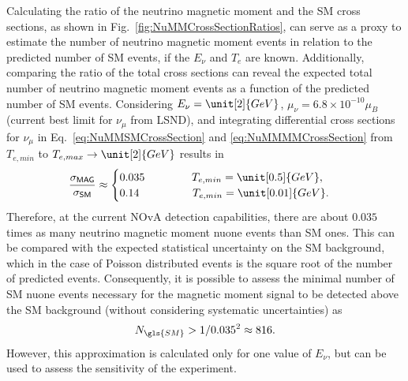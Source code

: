 Calculating the ratio of the neutrino magnetic moment and the \gls{SM} cross sections, as shown in Fig.~\ref{fig:NuMMCrossSectionRatios}, can serve as a proxy to estimate the number of neutrino magnetic moment events in relation to the predicted number of \gls{SM} events, if the $E_\nu$ and $T_e$ are known. Additionally, comparing the ratio of the total cross sections can reveal the expected total number of neutrino magnetic moment events as a function of the predicted number of \gls{SM} events. Considering $E_\nu=\unit[2]{GeV}$, $\mu_\nu=6.8\times10^{-10}\mu_B$ (current best limit for $\nu_\mu$ from LSND), and integrating differential cross sections for $\nu_\mu$ in Eq.~\ref{eq:NuMMSMCrossSection} and \ref{eq:NuMMMMCrossSection} from $T_{e,min}$ to $T_{e,max}\rightarrow\unit[2]{GeV}$ results in
\begin{equation}
\frac{\sigma_{\textsf{MAG}}}{\sigma_{\textsf{SM}}}\approx
\begin{cases}
0.035\hspace*{1.5cm} T_{e,min}=\unit[0.5]{GeV},\\
0.14\hspace*{1.7cm}  T_{e,min}=\unit[0.01]{GeV}.
\end{cases}
\end{equation}
Therefore, at the current \gls{NOvA} detection capabilities, there are about $0.035$ times as many neutrino magnetic moment \gls{nuone} events than \gls{SM} ones. This can be compared with the expected statistical uncertainty on the \gls{SM} background, which in the case of Poisson distributed events is the square root of the number of predicted events. Consequently, it is possible to assess the minimal number of \gls{SM} \gls{nuone} events necessary for the magnetic moment signal to be detected above the \gls{SM} background (without considering systematic uncertainties) as
\begin{equation}
N_{\gls{SM}}>1/0.035^2 \approx 816.
\end{equation}
However, this approximation is calculated only for one value of $E_\nu$, but can be used to assess the sensitivity of the experiment.

